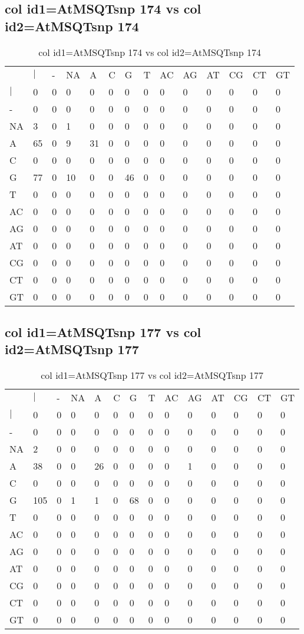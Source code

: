 \subsection{col id1=AtMSQTsnp 174 vs col id2=AtMSQTsnp 174}
\begin{center}
\begin{longtable}{|l|l|l|l|l|l|l|l|l|l|l|l|l|l|}
\caption{col id1=AtMSQTsnp 174 vs col id2=AtMSQTsnp 174} \label{table_dm546}\\
\hline
\\
\hline
&$|$&-&NA&A&C&G&T&AC&AG&AT&CG&CT&GT\\
$|$&0&0&0&0&0&0&0&0&0&0&0&0&0\\
-&0&0&0&0&0&0&0&0&0&0&0&0&0\\
NA&3&0&1&0&0&0&0&0&0&0&0&0&0\\
A&65&0&9&31&0&0&0&0&0&0&0&0&0\\
C&0&0&0&0&0&0&0&0&0&0&0&0&0\\
G&77&0&10&0&0&46&0&0&0&0&0&0&0\\
T&0&0&0&0&0&0&0&0&0&0&0&0&0\\
AC&0&0&0&0&0&0&0&0&0&0&0&0&0\\
AG&0&0&0&0&0&0&0&0&0&0&0&0&0\\
AT&0&0&0&0&0&0&0&0&0&0&0&0&0\\
CG&0&0&0&0&0&0&0&0&0&0&0&0&0\\
CT&0&0&0&0&0&0&0&0&0&0&0&0&0\\
GT&0&0&0&0&0&0&0&0&0&0&0&0&0\\
\hline
\end{longtable}
\end{center}

\subsection{col id1=AtMSQTsnp 177 vs col id2=AtMSQTsnp 177}
\begin{center}
\begin{longtable}{|l|l|l|l|l|l|l|l|l|l|l|l|l|l|}
\caption{col id1=AtMSQTsnp 177 vs col id2=AtMSQTsnp 177} \label{table_dm548}\\
\hline
\\
\hline
&$|$&-&NA&A&C&G&T&AC&AG&AT&CG&CT&GT\\
$|$&0&0&0&0&0&0&0&0&0&0&0&0&0\\
-&0&0&0&0&0&0&0&0&0&0&0&0&0\\
NA&2&0&0&0&0&0&0&0&0&0&0&0&0\\
A&38&0&0&26&0&0&0&0&1&0&0&0&0\\
C&0&0&0&0&0&0&0&0&0&0&0&0&0\\
G&105&0&1&1&0&68&0&0&0&0&0&0&0\\
T&0&0&0&0&0&0&0&0&0&0&0&0&0\\
AC&0&0&0&0&0&0&0&0&0&0&0&0&0\\
AG&0&0&0&0&0&0&0&0&0&0&0&0&0\\
AT&0&0&0&0&0&0&0&0&0&0&0&0&0\\
CG&0&0&0&0&0&0&0&0&0&0&0&0&0\\
CT&0&0&0&0&0&0&0&0&0&0&0&0&0\\
GT&0&0&0&0&0&0&0&0&0&0&0&0&0\\
\hline
\end{longtable}
\end{center}

